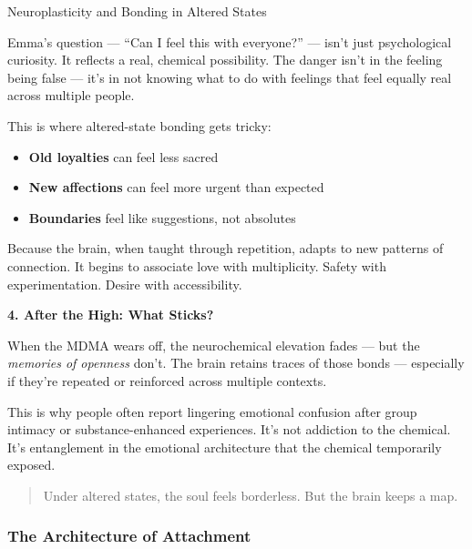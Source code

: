 \begin{TechnicalSidebar}{Neuroplasticity and Bonding in Altered States}
  \medskip
  
  
  Emma’s question — “Can I feel this with everyone?” — isn’t just psychological curiosity.
  It reflects a real, chemical possibility.
  The danger isn’t in the feeling being false — it’s in not knowing what to do with feelings that feel equally 
  real across multiple people.

  \medskip
  
  
  This is where altered-state bonding gets tricky:

  \medskip
  
  
  \begin{itemize}
    \item \textbf{Old loyalties} can feel less sacred
    \item \textbf{New affections} can feel more urgent than expected
    \item \textbf{Boundaries} feel like suggestions, not absolutes
  \end{itemize}

  \medskip
  
  
  Because the brain, when taught through repetition, adapts to new patterns of connection.
  It begins to associate love with multiplicity.
  Safety with experimentation.
  Desire with accessibility.
  
  \medskip
  

  \textbf{4. After the High: What Sticks?}

  \medskip
  
  
  When the MDMA wears off, the neurochemical elevation fades — but the \textit{memories of openness} don’t.
  The brain retains traces of those bonds — especially if they’re repeated or reinforced across multiple contexts.

  \medskip
  
  
  This is why people often report lingering emotional confusion after group intimacy or substance-enhanced 
  experiences. It’s not addiction to the chemical.
  It’s entanglement in the emotional architecture that the chemical temporarily exposed.
  
  \medskip
  
  \begin{quote}
  Under altered states, the soul feels borderless.
  But the brain keeps a map.
  \end{quote}

\end{TechnicalSidebar}


\subsubsection{The Architecture of Attachment}

